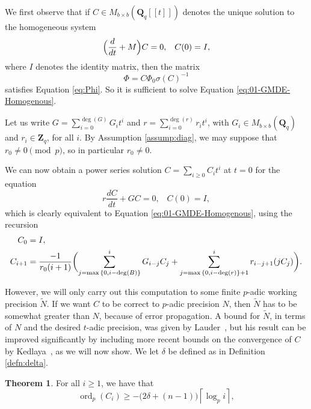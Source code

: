 \documentclass[a4paper,11pt]{article}
\numberwithin{equation}{section}
\providecommand{\ceil}[1]{\left\lceil#1\right\rceil}   %
\newcommand{\ZZ}{\mathbf{Z}} %
\newcommand{\QQ}{\mathbf{Q}} %
\DeclareMathOperator{\ord}{ord}          %
\theoremstyle{definition}
\newtheorem{thm}{Theorem}[section]
\begin{document}
We first observe that if $C \in M_{b \times b}(\QQ_q[[t]])$ denotes the unique solution to the 
homogeneous system
\begin{equation} \label{eq:01-GMDE-Homogenous}
\Bigl(\frac{d}{dt} + M\Bigr) C = 0, \; \; \; C(0)=I,
\end{equation}
where $I$ denotes the identity matrix, then the matrix
\begin{equation*}
\Phi = C \Phi_0 \sigma(C)^{-1}
\end{equation*}
satisfies Equation \eqref{eq:Phi}. So it is sufficient to solve Equation 
\eqref{eq:01-GMDE-Homogenous}.

Let us write $G = \sum_{i=0}^{\deg(G)} G_i t^i$ and $r= \sum_{i=0}^{\deg(r)} r_i t^i$,
with $G_i \in M_{b \times b}(\QQ_q)$ and $r_i \in \ZZ_q$, for all $i$. By Assumption 
\ref{assump:diag}, we may suppose that $r_0 \neq 0 \pmod{p}$, so in particular $r_0 \neq 0$.

We can now obtain a power series solution $C = \sum_{i \geq 0} C_i t^i$ at $t=0$ for 
the equation
\begin{equation*}
r \frac{dC}{dt} + G C = 0, \; \; \; C(0)=I,
\end{equation*}
which is clearly equivalent to Equation \eqref{eq:01-GMDE-Homogenous}, using the recursion 
\begin{align}
C_0 &= I, \notag \\ 
C_{i+1} &= \frac{-1}{r_0 (i+1)} \biggl(
    \sum_{j=\max{\{0,i-\deg(B)\}}}^i G_{i-j} C_j + 
    \sum_{j=\max{\{0,i-\deg(r)\}}+1}^i r_{i-j+1} (j C_j) \biggr). \label{eq:recursiondifeq}
\end{align}

However, we will only carry out this computation to some finite $p$-adic working precision $\tilde{N}$. If
we want $C$ to be correct to $p$-adic precision $N$, then $\tilde{N}$ has to be somewhat greater than $N$, 
because of error propagation. A bound for $\tilde{N}$, in terms of $N$ and the desired $t$-adic precision, 
was given by Lauder~\citep[Theorem~5.1]{Lauder2006}, but his result can be improved significantly by including 
more recent bounds on the convergence of $C$ by Kedlaya~\citep{Kedlaya2010}, as we will now show. We let
 $\delta$ be defined as in Definition \ref{defn:delta}. 

\begin{thm} \label{thm:valC}
For all $i \geq 1$, we have that
\begin{equation*}
\ord_p(C_i) \geq - \bigl(2 \delta + (n - 1)\bigr) \ceil{\log_p i},
\end{equation*}
\end{thm}
\end{document}
